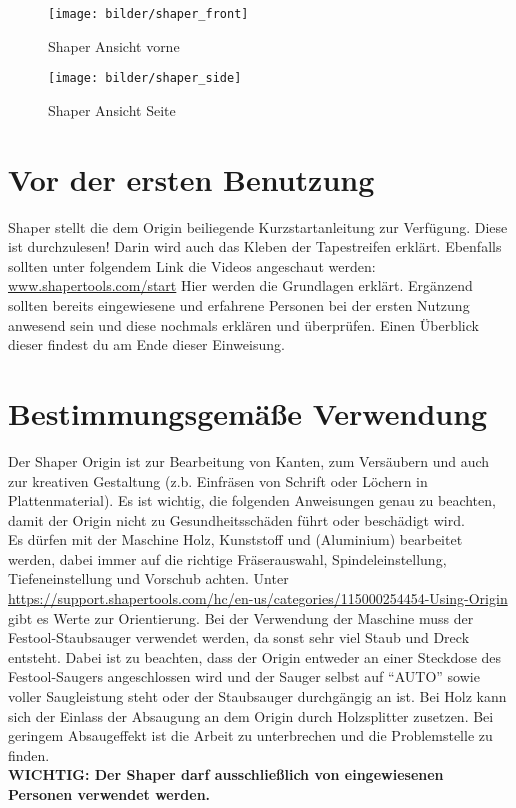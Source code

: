 \documentclass{\basedir/fablab-document}
\begin{document}
\begin{figure}[h!]
    \centering
    \texttt{[image: bilder/shaper\_front]}
    \caption{Shaper Ansicht vorne}
    \label{fig:sketch}
\end{figure}

\begin{figure}[h!]
    \centering
    \texttt{[image: bilder/shaper\_side]}
    \caption{Shaper Ansicht Seite}
    \label{fig:sketch2}
\end{figure}

\section{Vor der ersten Benutzung}
Shaper stellt die dem Origin beiliegende Kurzstartanleitung zur Verfügung. Diese ist durchzulesen! Darin wird auch das Kleben der Tapestreifen erklärt.
Ebenfalls sollten unter folgendem Link die Videos angeschaut werden: \url{www.shapertools.com/start} Hier werden die Grundlagen erklärt. Ergänzend sollten bereits eingewiesene und erfahrene Personen bei der ersten Nutzung anwesend sein und diese nochmals erklären und überprüfen. Einen Überblick dieser findest du am Ende dieser Einweisung.

\section{Bestimmungsgemäße Verwendung}
Der Shaper Origin ist zur Bearbeitung von Kanten, zum Versäubern und auch zur kreativen Gestaltung (z.b. Einfräsen von Schrift oder Löchern in Plattenmaterial). Es ist wichtig, die folgenden Anweisungen genau zu beachten, damit der Origin nicht zu Gesundheitsschäden führt oder beschädigt wird.\\
Es dürfen mit der Maschine Holz, Kunststoff und (Aluminium) bearbeitet werden, dabei immer auf die richtige Fräserauswahl, Spindeleinstellung, Tiefeneinstellung und Vorschub achten. Unter \url{https://support.shapertools.com/hc/en-us/categories/115000254454-Using-Origin} gibt es Werte zur Orientierung. Bei der Verwendung der Maschine muss der Festool-Staubsauger verwendet werden, da sonst sehr viel Staub und Dreck entsteht. Dabei ist zu beachten, dass der Origin entweder an einer Steckdose des Festool-Saugers angeschlossen wird und der Sauger selbst auf \enquote{AUTO} sowie voller Saugleistung steht oder der Staubsauger durchgängig an ist. Bei Holz kann sich der Einlass der Absaugung an dem Origin durch Holzsplitter zusetzen. Bei geringem Absaugeffekt ist die Arbeit zu unterbrechen und die Problemstelle zu finden.\\
\textbf{WICHTIG: Der Shaper darf ausschließlich von eingewiesenen Personen verwendet werden.}
\end{document}
